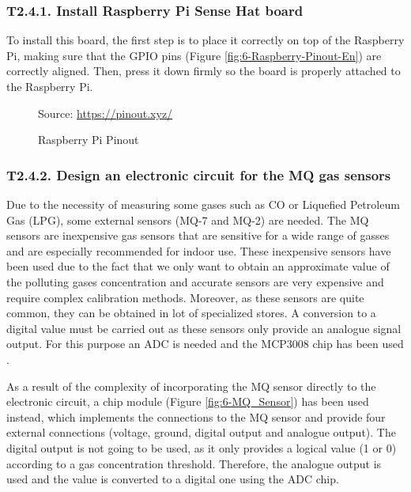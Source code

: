 \subsubsection{T2.4.1. Install Raspberry Pi Sense Hat board}
To install this board, the first step is to place it correctly on top of the Raspberry Pi, making sure that the GPIO pins (Figure \ref{fig:6-Raspberry-Pinout-En}) are correctly aligned. Then, press it down firmly so the board is properly attached to the Raspberry Pi.

\begin{figure}[htb]
	\centering
	\caption{Raspberry Pi Pinout}
	\label{fig:6-Raspberry-Pinout}{Source: \url{https://pinout.xyz/}}
\end{figure}

\subsubsection{T2.4.2. Design an electronic circuit for the MQ gas sensors}
Due to the necessity of measuring some gases such as CO or Liquefied Petroleum Gas (LPG), some external sensors (MQ-7 and MQ-2) are needed. The MQ sensors are inexpensive gas sensors that are sensitive for a wide range of gasses and are especially recommended for indoor use. These inexpensive sensors have been used due to the fact that we only want to obtain an approximate value of the polluting gases concentration and accurate sensors are very expensive and require complex calibration methods. Moreover, as these sensors are quite common, they can be obtained in lot of specialized stores. A conversion to a digital value must be carried out as these sensors only provide an analogue signal output. For this purpose an \ac{ADC} is needed and the MCP3008 chip has been used \cite{MCP3008}.

As a result of the complexity of incorporating the MQ sensor directly to the electronic circuit, a chip module (Figure \ref{fig:6-MQ_Sensor}) has been used instead, which implements the connections to the MQ sensor and provide four external connections (voltage, ground, digital output and analogue output). The digital output is not going to be used, as it only provides a logical value (1 or 0) according to a gas concentration threshold. Therefore, the analogue output is used and the value is converted to a digital one using the \ac{ADC} chip.

